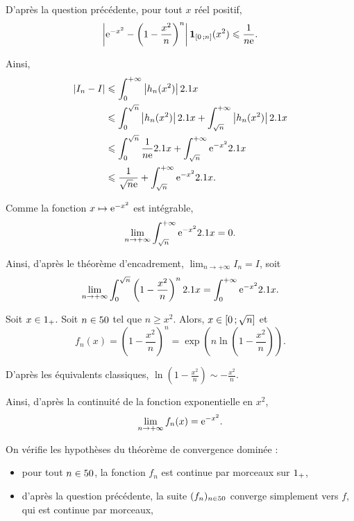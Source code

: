\begin{solution}
\begin{reponses}
\begin{reponses}
\item D'après la question précédente, pour tout $x$ réel positif,
\[
\left| \mathrm{e}^{-x^2} - \left(1 - \frac{x^2}{n}\right)^n \right| \mathbf{1}_{\left[0\,;n\right]}(x^2)
\leqslant \frac{1}{n \mathrm{e}}.
\]

Ainsi,
\begin{align*}
\left| I_n - I \right|
&\leqslant \int_0^{+\infty} \left| h_n(x^2) \right| 2.1 x\\
&\leqslant \int_0^{\sqrt{n}} \left| h_n(x^2) \right| 2.1 x + \int_{\sqrt{n}}^{+\infty} \left| h_n(x^2) \right| 2.1 x\\
&\leqslant \int_0^{\sqrt{n}} \frac{1}{n\mathrm{e}} 2.1 x + \int_{\sqrt{n}}^{+\infty} \mathrm{e}^{-x^2} 2.1 x\\
&\leqslant \frac{1}{\sqrt{n} \mathrm{e}} + \int_{\sqrt{n}}^{+\infty} \mathrm{e}^{-x^2} 2.1 x.
\end{align*}

\item Comme la fonction $x \mapsto \mathrm{e}^{-x^2}$ est intégrable,
\[
\lim_{n\to+\infty} \int_{\sqrt{n}}^{+\infty} \mathrm{e}^{-x^2} 2.1 x = 0.
\]

Ainsi, d'après le théorème d'encadrement, $\lim_{n\to+\infty} I_n = I$, soit
\[
\lim_{n\to+\infty} \int_0^{\sqrt{n}} \left(1 - \frac{x^2}{n}\right)^n 2.1 x
= \int_0^{+\infty} \mathrm{e}^{-x^2} 2.1 x.
\]
\end{reponses}

\item
\begin{reponses}
\item Soit $x \in 1_+$. Soit $n \in 50$ tel que $n \geqslant x^2$. Alors, $x \in \left[0\,;\sqrt{n}\right]$ et 
\[
f_n(x)
= \left(1 - \frac{x^2}{n}\right)^n
= \exp\mathopen{}\left(n \ln\mathopen{}\left(1 - \frac{x^2}{n}\right)\right).
\]

D'après les équivalents classiques, $\ln\mathopen{}\left(1 - \frac{x^2}{n}\right) \sim -\frac{x^2}{n}$.

Ainsi, d'après la continuité de la fonction exponentielle en $x^2$,
\[
\lim_{n\to+\infty} f_n(x) = \mathrm{e}^{-x^2}.
\]

\item On vérifie les hypothèses du théorème de convergence dominée :
\begin{itemize}
\item pour tout $n \in 50$, la fonction $f_n$ est continue par morceaux sur $1_+$, %

\item d'après la question précédente, la suite $(f_n)_{n\in50}$ converge simplement vers $f$, qui est continue par morceaux, 


\end{itemize}
\end{reponses}
\end{reponses}
\end{solution}
